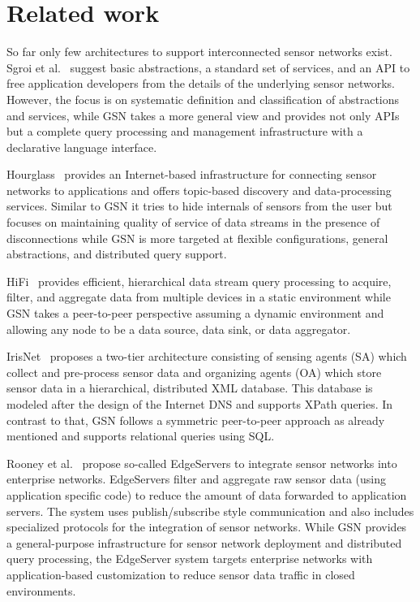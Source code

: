 \section{Related work}
\label{sec:relatedwork}

So far only few architectures to support interconnected sensor networks exist.
Sgroi et al.~\cite{Sgroi05} suggest basic abstractions, a standard set of
services, and an API to free application developers from the details of the
underlying sensor networks.  However, the focus is on systematic definition and
classification of abstractions and services, while GSN takes a more general
view and provides not only APIs but a complete query processing and management
infrastructure with a declarative language interface.

Hourglass~\cite{Shneidman04} provides an Internet-based infrastructure for
connecting sensor networks to applications and offers topic-based discovery and
data-processing services. Similar to GSN it tries to hide internals of sensors
from the user but focuses on maintaining quality of service of data streams in
the presence of disconnections while GSN is more targeted at flexible
configurations, general abstractions, and distributed query support.

HiFi~\cite{Franklin05} provides efficient, hierarchical data stream query
processing to acquire, filter, and aggregate data from multiple devices in a
static environment while GSN takes a peer-to-peer perspective assuming a
dynamic environment and allowing any node to be a data source, data sink, or
data aggregator.

IrisNet~\cite{Gibbons03} proposes a two-tier architecture consisting of sensing
agents (SA) which collect and pre-process sensor data and organizing agents
(OA) which store sensor data in a hierarchical, distributed XML database. This
database is modeled after the design of the Internet DNS and supports XPath
queries. In contrast to that, GSN follows a symmetric peer-to-peer approach as
already mentioned and supports relational queries using SQL.

Rooney et al.~\cite{Rooney06} propose so-called EdgeServers to integrate sensor
networks into enterprise networks. EdgeServers filter and aggregate raw sensor
data (using application specific code) to reduce the amount of data forwarded
to application servers. The system uses publish/subscribe style communication
and also includes specialized protocols for the integration of sensor
networks. While GSN provides a general-purpose infrastructure for sensor
network deployment and distributed query processing, the EdgeServer system
targets enterprise networks with application-based customization to reduce
sensor data traffic in closed environments.

